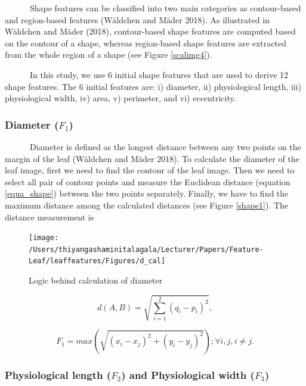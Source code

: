 \documentclass{article}
\begin{document}
~~~~~~Shape features can be classified into two main categories as
contour-based and region-based features (Wäldchen and Mäder 2018). As
illustrated in Wäldchen and Mäder (2018), contour-based shape features
are computed based on the contour of a shape, whereas region-based shape
features are extracted from the whole region of a shape (see Figure
\ref{scalimg4}).

~~~~~~In this study, we use 6 initial shape features that are used to
derive 12 shape features. The 6 initial features are: i) diameter, ii)
physiological length, iii) physiological width, iv) area, v) perimeter,
and vi) eccentricity.

\hypertarget{diameter-f_1}{%
\subsubsection{\texorpdfstring{Diameter
(\(F_1\))}{Diameter (F\_1)}}\label{diameter-f_1}}

~~~~~~Diameter is defined as the longest distance between any two points
on the margin of the leaf (Wäldchen and Mäder 2018). To calculate the
diameter of the leaf image, first we need to find the contour of the
leaf image. Then we need to select all pair of contour points and
measure the Euclidean distance (equation \ref{equa_shape}) between the
two points separately. Finally, we have to find the maximum distance
among the calculated distances (see Figure \ref{shape1}). The distance
measurement is

\begin{figure}[!ht]

{\centering \texttt{[image: /Users/thiyangashaminitalagala/Lecturer/Papers/Feature-Leaf/leaffeatures/Figures/d\_cal]} 

}

\caption{\label{shape1}Logic behind calculation of diameter}\label{fig:unnamed-chunk-8}
\end{figure}

\begin{equation}
    d\left( A,B\right)   = \sqrt {\sum _{i=1}^{2}  \left( q_{i}-p_{i}\right)^2},
\label{equa_shape}
\end{equation}

\begin{equation}
   F_1 = max(\sqrt{(x_i-x_j)^2 + (y_i-y_j)^2}); \forall i,j, i \neq j.
\label{equa_F1}
\end{equation}

\hypertarget{physiological-length-f_2-and-physiological-width-f_3}{%
\subsubsection{\texorpdfstring{Physiological length (\(F_2\)) and
Physiological width
(\(F_3\))}{Physiological length (F\_2) and Physiological width (F\_3)}}\label{physiological-length-f_2-and-physiological-width-f_3}}
\end{document}
